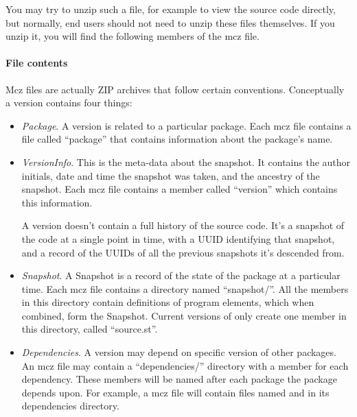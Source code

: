 \documentclass[a4paper,10pt,twoside]{book}
\begin{document}

You may try to unzip such a file, for example to view the source code directly, but normally, end users should not need to unzip these files themselves.
If you unzip it, you will find the following members of the mcz file.

\paragraph{File contents}
Mcz files are actually ZIP archives that follow certain conventions. Conceptually a version contains four things:

\begin{itemize}
\item \emph{Package}. A version is related to a particular package. Each mcz file contains a file called ``package'' that contains information about the package's name.

\item \emph{VersionInfo}. This is the meta-data about the snapshot. It contains the author initials, date and time the snapshot was taken, and the ancestry of the snapshot. Each mcz file contains a member called ``version'' which contains this information.

A version doesn't contain a full history of the source code. It's a snapshot of the code at a single point in time, with a UUID identifying that snapshot, and a record of the UUIDs of all the previous snapshots it's descended from.

\item \emph{Snapshot}. A Snapshot is a record of the state of the package at a particular time. Each mcz file contains a directory named ``snapshot/''. All the members in this directory contain definitions of program elements, which when combined, form the Snapshot. Current versions of \Mont only create one member in this directory, called ``source.st''.

\item \emph{Dependencies}. A version may depend on specific version of other packages. An mcz file may contain a ``dependencies/'' directory with a member for each dependency. These members will be named after each package the \Mont package depends upon. For example, a  mcz file will contain files named  and  in its dependencies directory.
\end{itemize}
\end{document}
